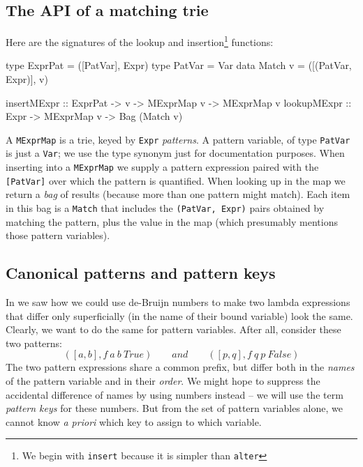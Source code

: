 \documentclass[acmsmall]{acmart}
\theoremstyle{theorem}
\theoremstyle{definition}
\theoremstyle{remark}
\begin{document}
\subsection{The API of a matching trie} \label{sec:match-api}

Here are the signatures of the lookup and insertion\footnote{We begin with \lstinline{insert}
  because it is simpler than \lstinline{alter}} functions:
\begin{code}
type ExprPat = ([PatVar], Expr)
type PatVar  = Var
data Match v = ([(PatVar, Expr)], v)

insertMExpr :: ExprPat -> v -> MExprMap v -> MExprMap v
lookupMExpr :: Expr -> MExprMap v -> Bag (Match v)
\end{code}
A \lstinline{MExprMap} is a trie, keyed by \lstinline{Expr} \emph{patterns}.
A pattern variable, of type \lstinline{PatVar} is just a \lstinline{Var}; we
use the type synonym just for documentation purposes. When inserting into a
\lstinline{MExprMap} we supply a pattern expression paired with the \lstinline{[PatVar]}
over which the pattern is quantified.  When looking up in the map we return a \emph{bag}
of results (because more than one pattern might match).  Each item in this bag is
a \lstinline{Match} that includes the \lstinline{(PatVar, Expr)} pairs obtained by
matching the pattern, plus the value in the map (which presumably mentions those
pattern variables).

\subsection{Canonical patterns and pattern keys}

In  we saw how we could use de-Bruijn numbers to
make two lambda expressions that differ only superficially (in the
name of their bound variable) look the same.  Clearly, we want to do
the same for pattern variables.  After all, consider these two patterns:
$$
([a,b], f~a~b~True) \qquad and \qquad ([p,q], f~q~p~False)
$$
The two pattern expressions share a common prefix, but differ both in the
\emph{names} of the pattern variable and in their \emph{order}. We might hope
to suppress the accidental difference of names by using numbers instead -- we will
use the term \emph{pattern keys} for these numbers.
But from the set of pattern variables alone, we
cannot know \emph{a priori} which key to assign to which variable.
\end{document}
